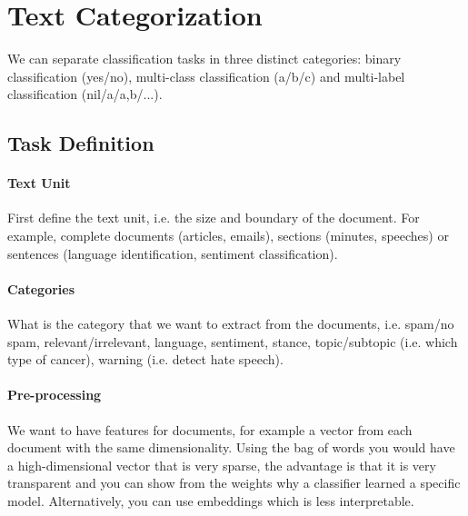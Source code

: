 \section{Text Categorization}

We can separate classification tasks in three distinct
categories: binary classification (yes/no), multi-class
classification (a/b/c) and multi-label
classification (nil/a/a,b/...).

\subsection{Task Definition}

\paragraph{Text Unit}

First define the text unit, i.e. the size and boundary
of the document. For example, complete documents (articles,
emails), sections (minutes, speeches) or sentences (language
identification, sentiment classification).

\paragraph{Categories}

What is the category that we want to extract from the documents,
i.e. spam/no spam, relevant/irrelevant, language, sentiment, stance,
topic/subtopic (i.e. which type of cancer), warning (i.e. detect hate
speech).

\paragraph{Pre-processing}

We want to have features for documents, for example a vector
from each document with the same dimensionality. Using the bag
of words you would have a high-dimensional vector that is very
sparse, the advantage is that it is very transparent and you can
show from the weights why a classifier learned a specific model.
Alternatively, you can use embeddings which is less interpretable.


